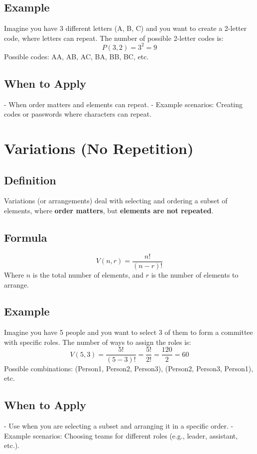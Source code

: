 \documentclass{article}
\begin{document}
\subsection{Example}
Imagine you have 3 different letters (A, B, C) and you want to create a 2-letter code, where letters can repeat. The number of possible 2-letter codes is:
\[
P(3, 2) = 3^2 = 9
\]
Possible codes: AA, AB, AC, BA, BB, BC, etc.

\subsection{When to Apply}
- When order matters and elements can repeat.
- Example scenarios: Creating codes or passwords where characters can repeat.

\newpage
\section{Variations (No Repetition)}

\subsection{Definition}
Variations (or arrangements) deal with selecting and ordering a subset of elements, where \textbf{order matters}, but \textbf{elements are not repeated}.

\subsection{Formula}
\[
V(n, r) = \frac{n!}{(n - r)!}
\]
Where \(n\) is the total number of elements, and \(r\) is the number of elements to arrange.

\subsection{Example}
Imagine you have 5 people and you want to select 3 of them to form a committee with specific roles. The number of ways to assign the roles is:
\[
V(5, 3) = \frac{5!}{(5 - 3)!} = \frac{5!}{2!} = \frac{120}{2} = 60
\]
Possible combinations: (Person1, Person2, Person3), (Person2, Person3, Person1), etc.

\subsection{When to Apply}
- Use when you are selecting a subset and arranging it in a specific order.
- Example scenarios: Choosing teams for different roles (e.g., leader, assistant, etc.).
\end{document}
